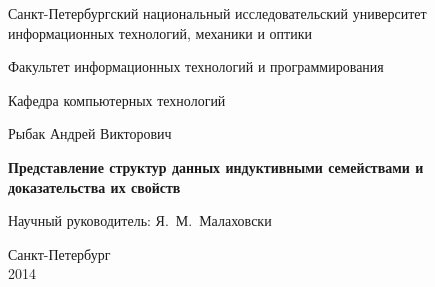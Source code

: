 \documentclass[a4paper,oneside]{report}
\begin{document}
\initializefrontsections

\pagestyle{title}

\begin{center}
Санкт-Петербургский национальный исследовательский университет \\ информационных технологий, механики и оптики

\vspace{2cm}

Факультет информационных технологий и программирования

Кафедра компьютерных технологий

\vspace{3cm}

{\Large Рыбак Андрей Викторович}

\vspace{2cm}

\vbox{\LARGE\bfseries
Представление структур данных индуктивными семействами и доказательства их свойств
}

\vspace{4cm}

{\Large Научный руководитель: Я.~М.~Малаховски}

\vspace{6cm}
Санкт-Петербург\\ 2014
\end{center}

\newpage
\setcounter{page}{3}
\pagestyle{plain}

\tableofcontents

\startthechapters



% 
% 

\printbibliography
\end{document}

